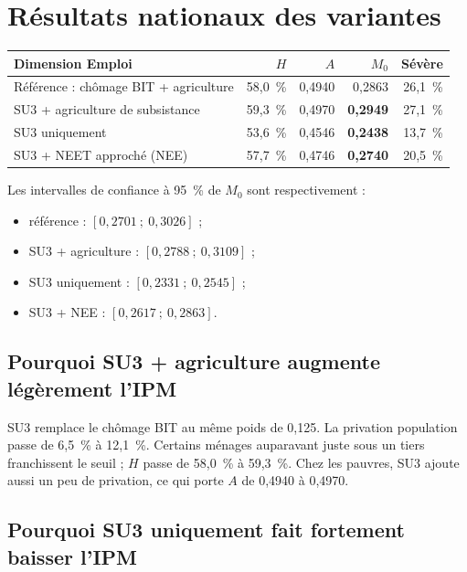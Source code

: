 \documentclass[11pt,a4paper]{article}
\begin{document}
\section{Résultats nationaux des variantes}

\begin{center}
\small
\begin{tabular}{@{}p{4.8cm}rrrr@{}}
\toprule
\textbf{Dimension Emploi} & $H$ & $A$ & $M_0$ & \textbf{Sévère} \\
\midrule
Référence : chômage BIT + agriculture & 58,0~\% & 0,4940 & 0,2863 & 26,1~\% \\
SU3 + agriculture de subsistance & 59,3~\% & 0,4970 & \textbf{0,2949} & 27,1~\% \\
SU3 uniquement & 53,6~\% & 0,4546 & \textbf{0,2438} & 13,7~\% \\
SU3 + NEET approché (NEE) & 57,7~\% & 0,4746 & \textbf{0,2740} & 20,5~\% \\
\bottomrule
\end{tabular}
\end{center}

Les intervalles de confiance à 95~\% de $M_0$ sont respectivement :

\begin{itemize}
  \item référence : $[0,2701\ ;\ 0,3026]$ ;
  \item SU3 + agriculture : $[0,2788\ ;\ 0,3109]$ ;
  \item SU3 uniquement : $[0,2331\ ;\ 0,2545]$ ;
  \item SU3 + NEE : $[0,2617\ ;\ 0,2863]$.
\end{itemize}

\subsection{Pourquoi SU3 + agriculture augmente légèrement l'IPM}

SU3 remplace le chômage BIT au même poids de 0,125. La privation population passe de 6,5~\% à
12,1~\%. Certains ménages auparavant juste sous un tiers franchissent le seuil ; $H$ passe de
58,0~\% à 59,3~\%. Chez les pauvres, SU3 ajoute aussi un peu de privation, ce qui porte $A$ de
0,4940 à 0,4970.

\subsection{Pourquoi SU3 uniquement fait fortement baisser l'IPM}
\end{document}
